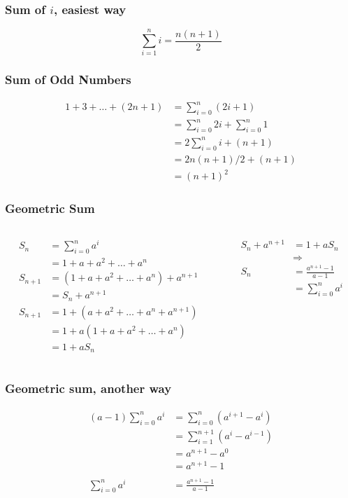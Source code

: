 \documentclass{beamer}
\newcommand{\bfr}[1]{\begin{frame}[fragile]\frametitle{{ #1 }}}
\newcommand{\cola}{\begin{columns}\begin{column}{0.5\textwidth}}
\newcommand{\colb}{\end{column}\begin{column}{0.5\textwidth}}
\newcommand{\colc}{\end{column}\end{columns}}
\begin{document}
\bfr{Sum of $i$, easiest way}
\[
\sum_{i=1}^n i = \frac{n(n+1)}{2}
\]
\begin{center}
\end{center}

\end{frame}

\bfr{Sum of Odd Numbers}
\begin{align*}
1 + 3 + \ldots + (2n+1) &= \sum_{i=0}^n (2i+1) 
\\
&= \sum_{i=0}^n 2i + \sum_{i=0}^n 1
\\
&= 2\sum_{i=0}^n i + (n+1)
\\
&= 2n(n+1)/2 + (n+1)
\\
&= (n+1)^2
\end{align*}
\end{frame}


\bfr{Geometric Sum}
\cola
\begin{align*}
  S_n &= 
   \sum_{i=0}^n a^i\\
  &= 1 + a + a^2 + \ldots + a^n
  \\
  S_{n+1} &= (1 + a + a^2 + \ldots + a^n) + a^{n+1}
  \\
  &= S_{n} + a^{n+1}
  \\
  S_{n+1} &= 1 + (a + a^2 + \ldots + a^n + a^{n+1})
  \\
  &= 1 + a(1 + a + a^2  +  \ldots + a^n)
  \\
  &= 1 + aS_n
\end{align*}
\colb
\begin{align*}
  S_n + a^{n+1} &= 1 + aS_n
  \\
  &\Rightarrow\\
 S_n
  &= \frac{a^{n+1} - 1}{a-1}\\
  &=   \sum_{i=0}^n a^i 
\end{align*}
\colc
\end{frame}

\bfr{Geometric sum, another way}
\begin{align*}
(a-1)\sum_{i=0}^n a^i &= \sum_{i=0}^n \left(a^{i+1} -a^i\right)\\
  &= \sum_{i=1}^{n+1} \left(a^{i} - a^{i-1}\right)\\
  &= a^{n+1} - a^0\\
  &= a^{n+1} - 1\\\\
  \sum_{i=0}^n a^i &= \frac{a^{n+1} - 1}{a-1}
\end{align*}
\end{frame}
\end{document}
